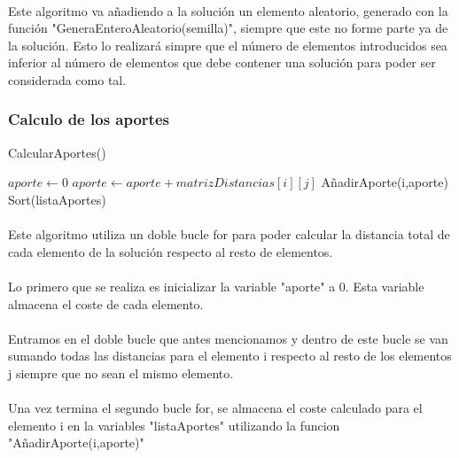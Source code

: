 \documentclass{article}
\begin{document}
	\paragraph{}Este algoritmo va añadiendo a la solución un elemento aleatorio, generado con la función "GeneraEnteroAleatorio(semilla)", siempre que este no forme parte ya de la solución. Esto lo realizará simpre que el número de elementos introducidos sea inferior al número de elementos que debe contener una solución para poder ser considerada como tal.

	\subsubsection{Calculo de los aportes}
	\begin{algorithm}[H]
		\caption{CalcularAportes()}
		\begin{algorithmic}
			\STATE $aporte \leftarrow 0$
			\STATE $aporte \leftarrow aporte + matrizDistancias[i][j]$
			\ENDFOR
			\STATE AñadirAporte(i,aporte)
			\ENDFOR
			\STATE Sort(listaAportes)
			
		\end{algorithmic}
	\end{algorithm}

	\paragraph{}Este algoritmo utiliza un doble bucle for para poder calcular la distancia total de cada elemento de la solución respecto al resto de elementos.
	
	\paragraph{}Lo primero que se realiza es inicializar la variable "aporte" a 0. Esta variable almacena el coste de cada elemento.
	
	\paragraph{}Entramos en el doble bucle que antes mencionamos y dentro de este bucle se van sumando todas las distancias para el elemento i respecto al resto de los elementos j siempre que no sean el mismo elemento.
	
	\paragraph{}Una vez termina el segundo bucle for, se almacena el coste calculado para el elemento i en la variables "listaAportes" utilizando la funcion "AñadirAporte(i,aporte)"
	
\end{document}

